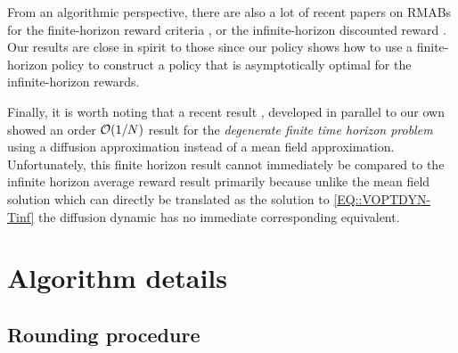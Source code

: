 From an algorithmic perspective, there are also a lot of recent papers on RMABs for the finite-horizon reward criteria 
\cite{hu2017asymptotically,zayas2019asymptotically,brown2020index,ghosh2022indexability,zhang2021restless,GGY23}, or the infinite-horizon discounted reward \cite{zhang2022near,ghosh2022indexability}. Our results are close in spirit to those since our policy shows how to use a finite-horizon policy to construct a policy that is asymptotically optimal for the infinite-horizon rewards. 

Finally, it is worth noting that a recent result \cite{yan2024optimalgap}, developed in parallel to our own showed an order $\mathcal{O}(1/N)$ result for the \emph{degenerate finite time horizon problem} using a diffusion approximation instead of a mean field approximation. Unfortunately, this finite horizon result cannot immediately be compared to the infinite horizon average reward result primarily because unlike the mean field solution which can directly be translated as the solution to \eqref{EQ::VOPTDYN-Tinf} the diffusion dynamic has no immediate corresponding equivalent.

\section{Algorithm details}
\label{apx:algo}

\subsection{Rounding procedure}
\label{apx:rounding}

